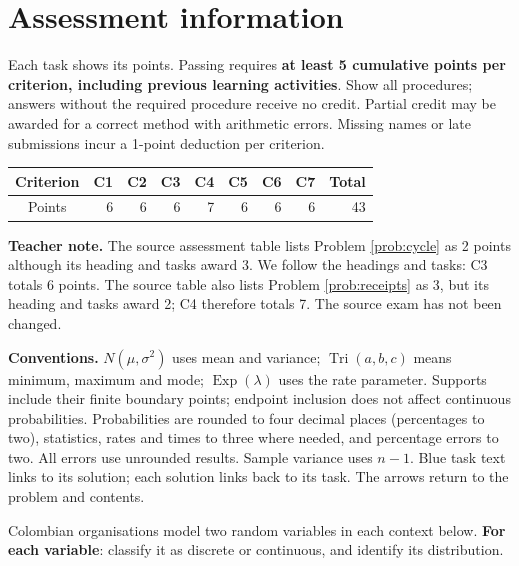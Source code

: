 \section*{Assessment information}
Each task shows its points. Passing requires \textbf{at least 5 cumulative points per criterion, including previous learning activities}.
Show all procedures; answers without the required procedure receive no credit.
Partial credit may be awarded for a correct method with arithmetic errors.
Missing names or late submissions incur a 1-point deduction per criterion.
\begin{center}
\begin{tabular}{c|rrrrrrr|r}
Criterion&C1&C2&C3&C4&C5&C6&C7&Total\\\hline
Points&6&6&6&7&6&6&6&43
\end{tabular}
\end{center}
\textbf{Teacher note.} The source assessment table lists Problem \ref{prob:cycle} as 2 points although its heading and tasks award 3.
We follow the headings and tasks: C3 totals 6 points. The source table also lists Problem \ref{prob:receipts} as 3, but its heading and tasks award 2; C4 therefore totals 7. The source exam has not been changed.

\textbf{Conventions.} $N(\mu,\sigma^2)$ uses mean and variance;
$\operatorname{Tri}(a,b,c)$ means minimum, maximum and mode;
$\operatorname{Exp}(\lambda)$ uses the rate parameter.
Supports include their finite boundary points; endpoint inclusion does not affect continuous probabilities.
Probabilities are rounded to four decimal places (percentages to two), statistics, rates and times to three where needed, and percentage errors to two.
All errors use unrounded results. Sample variance uses $n-1$.
Blue task text links to its solution; each solution links back to its task. The arrows return to the problem and contents.

\clearpage\def\CurrentProblem{models}
Colombian organisations model two random variables in each context below. \textbf{For each variable}: classify it as discrete or continuous, and identify its distribution.



